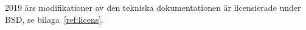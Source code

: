\begin{LIPSlicens}
    2019 års modifikationer av den tekniska dokumentationen är licensierade under BSD, se bilaga~\ref{ref:licens}. 
\end{LIPSlicens}
